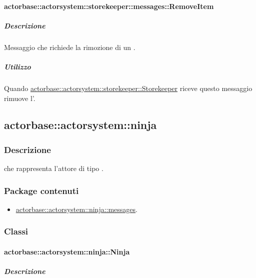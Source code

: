 \documentclass{scalatekids-article}
\begin{document}
\paragraph{actorbase::actorsystem::storekeeper::messages::RemoveItem}
\label{sec:actorbase::actorsystem::storekeeper::messages::RemoveItem}

\subparagraph{Descrizione}

Messaggio che richiede la rimozione di un .

\subparagraph{Utilizzo}

Quando \hyperref[sec:actorbase::actorsystem::storekeeper::Storekeeper]{actorbase::actorsystem::storekeeper::Storekeeper}
riceve questo messaggio rimuove l'.

\subsection{actorbase::actorsystem::ninja}
\label{sec:actorbase::actorsystem::ninja}

\subsubsection{Descrizione}

 che rappresenta l'attore di tipo .

\subsubsection{Package contenuti}

\begin{itemize}

\item \hyperref[sec:actorbase::actorsystem::ninja::messages]{actorbase::actorsystem::ninja::messages}.

\end{itemize}

\subsubsection{Classi}

\paragraph{actorbase::actorsystem::ninja::Ninja}
\label{sec:actorbase::actorsystem::ninja::Ninja}

\subparagraph{Descrizione}
\end{document}
